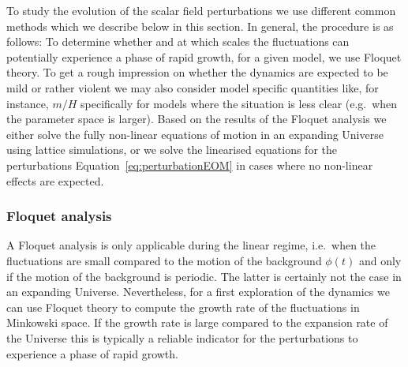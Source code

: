 \documentclass[12pt]{article}
\begin{document}
To study the evolution of the scalar field perturbations we use different common methods which we describe below in this section. In general, the procedure is as follows: To determine whether and at which scales the fluctuations can potentially experience a phase of rapid growth, for a given model, we use Floquet theory. To get a rough impression on whether the dynamics are expected to be mild or rather violent we may also consider model specific quantities like, for instance, $m/H$ specifically for models where the situation is less clear (e.g.\ when the parameter space is larger). Based on the results of the Floquet analysis we either solve the fully non-linear equations of motion in an expanding Universe using lattice simulations, or we solve the linearised equations for the perturbations Equation~\eqref{eq:perturbationEOM} in cases where no non-linear effects are expected.  


\subsubsection{Floquet analysis}
\label{sec:floquet analysis}
A Floquet analysis is only applicable during the linear regime, i.e.\ when the fluctuations are small compared to the motion of the background $\phi(t)$ and only if the motion of the background is periodic. The latter is certainly not the case in an expanding Universe. Nevertheless, for a first exploration of the dynamics we can use Floquet theory to compute the growth rate of the fluctuations in Minkowski space. If the growth rate is large compared to the expansion rate of the Universe this is typically a reliable indicator for the perturbations to experience a phase of rapid growth.
\end{document}
